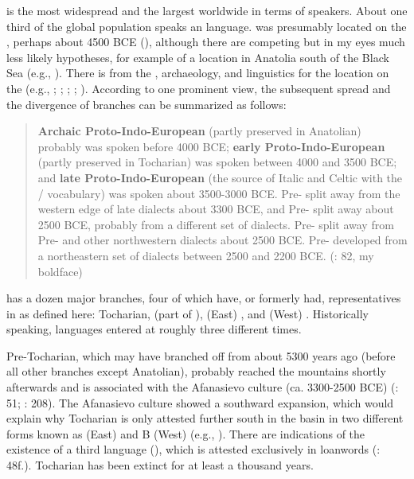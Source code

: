  is the most widespread and the largest  worldwide in terms of speakers. About one third of the global population speaks an  language.  was presumably located on the , perhaps about 4500 BCE (\citealt{AnthonyRinge2015}), although there are competing but in my eyes much less likely hypotheses, for example of a location in Anatolia south of the Black Sea (e.g., \citealt{Heggarty2013}). There is  from the , archaeology, and linguistics for the location on the  (e.g., \citealt{Anthony2007}; \citealt{AllentoftSikora2015}; \citealt{AnthonyRinge2015}; \citealt{HaakLazaridis2015}; \citealt{JonesGonzales-Fortes2015}). According to one prominent view, the subsequent spread and the divergence of  branches can be summarized as follows:

\begin{quote}
\textbf{Archaic Proto-Indo-European} (partly preserved in Anatolian) probably was spoken before 4000 BCE; \textbf{early Proto-Indo-European} (partly preserved in Tocharian) was spoken between 4000 and 3500 BCE; and \textbf{late Proto-Indo-European} (the source of Italic and Celtic with the / vocabulary) was spoken about 3500-3000 BCE. Pre- split away from the western edge of late  dialects about 3300 BCE, and Pre- split away about 2500 BCE, probably from a different set of dialects. Pre- split away from Pre- and other northwestern dialects about 2500 BCE. Pre- developed from a northeastern set of dialects between 2500 and 2200 BCE. (\citealt{Anthony2007}: 82, my boldface)
\end{quote}

 has a dozen major branches, four of which have, or formerly had, representatives in  as defined here: Tocharian,  (part of ), (East) , and (West) . Historically speaking,  languages entered  at roughly three different times.

Pre-Tocharian, which may have branched off from  about 5300 years ago (before all other branches except Anatolian), probably reached the  mountains shortly afterwards and is associated with the Afanasievo culture (ca. 3300-2500 BCE) (\citealt{Mallory2010}: 51; \citealt{AnthonyRinge2015}: 208). The Afanasievo culture showed a southward expansion, which would explain why Tocharian is only attested further south in the  basin in two different forms known as  (East) and B (West) (e.g., \citealt{Winter1998}). There are indications of the existence of a third language (), which is attested exclusively in loanwords (\citealt{Mallory2010}: 48f.). Tocharian has been extinct for at least a thousand years.

